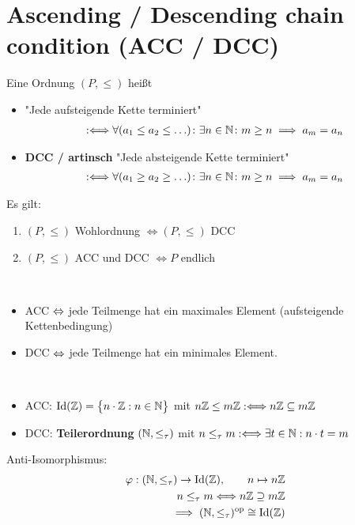 \section{Ascending / Descending chain condition (ACC / DCC)}
\begin{definition}
	Eine Ordnung $(P,\leq)$ heißt
	\begin{itemize}
		\item {} "Jede aufsteigende Kette terminiert"
		\begin{align*}
			:\Longleftrightarrow\forall(a_1\leq a_2\leq\ldots)\colon\exists n\in\mathbb{N}\colon m\geq n\implies a_m=a_n
		\end{align*}
		\item \textbf{DCC / artinsch} "Jede absteigende Kette terminiert"
		\begin{align*}
			:\Longleftrightarrow\forall(a_1\geq a_2\geq\ldots)\colon\exists n\in\mathbb{N}\colon m\geq n\implies a_m=a_n
		\end{align*}
	\end{itemize}
\end{definition}

\begin{lemma}
	Es gilt:
	\begin{enumerate}
		\item $(P,\leq)$ Wohlordnung $\Longleftrightarrow (P,\leq)$ DCC
		\item $(P,\leq)$ ACC und DCC $\Longleftrightarrow P$ endlich
	\end{enumerate}
\end{lemma}

\begin{bemerkung}\
	\begin{itemize}
		\item ACC $\Leftrightarrow$ jede Teilmenge hat ein maximales Element (aufsteigende Kettenbedingung)
		\item DCC $\Leftrightarrow$ jede Teilmenge hat ein minimales Element.
	\end{itemize}
\end{bemerkung}

\begin{beispiel}\
	\begin{itemize}
		\item ACC: $\text{Id}(\mathbb{Z})=\big\lbrace n\cdot\mathbb{Z}:n\in\mathbb{N}\big\rbrace$ mit $n\mathbb{Z}\leq m\mathbb{Z}:\Longleftrightarrow n\mathbb{Z}\subseteq m\mathbb{Z}$
		\item DCC: \textbf{Teilerordnung} $(\mathbb{N},\leq_\tau)$ mit $n\leq_ \tau m:\Longleftrightarrow\exists t\in\mathbb{N}:n\cdot t=m$
	\end{itemize}
	Anti-Isomorphismus:
	\begin{align*}
		\varphi:(\mathbb{N},\leq_\tau)\to\text{Id}(\mathbb{Z}),\qquad n\mapsto n\mathbb{Z}\\
		n\leq_\tau m\Longleftrightarrow n\mathbb{Z}\supseteq m\mathbb{Z}\\
		\implies(\mathbb{N},\leq_\tau)^{\text{op}}\cong\text{Id}(\mathbb{Z})
	\end{align*}
\end{beispiel}

